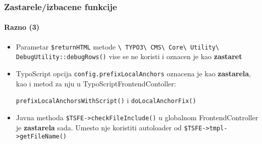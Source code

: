 \begin{frame}[fragile]
	\frametitle{Zastarele/izbacene funkcije}
	\framesubtitle{Razno (3)}

	\begin{itemize}

		\item Parametar \texttt{\$returnHTML} metode
			\small
				\texttt{\textbackslash
					TYPO3\textbackslash
					CMS\textbackslash
					Core\textbackslash
					Utility\textbackslash
					DebugUtility::debugRows()}
			\normalsize
			vise se ne koristi i oznacen je kao \textbf{zastaret}

		\item TypoScript opcija
			\small\texttt{config.prefixLocalAnchors}\normalsize\space
			oznacena je kao \textbf{zastarela}, kao i metod za nju u TypoScriptFrontendContoller:

			\small\texttt{prefixLocalAnchorsWithScript()}\normalsize\space
			i
			\small\texttt{doLocalAnchorFix()}\normalsize

		\item Javna methoda
			\small\texttt{\$TSFE->checkFileInclude()}\normalsize\space
			u globalnom FrontendController je \textbf{zastarela} sada.
			Umesto nje koristiti autoloader od \texttt{\$TSFE->tmpl->getFileName()}

	\end{itemize}

\end{frame}


